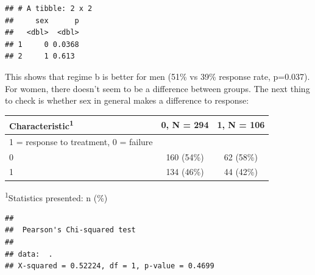 \documentclass[]{book}
\newenvironment{Shaded}{\begin{snugshade}}{\end{snugshade}}
\newcommand{\DataTypeTok}[1]{\textcolor[rgb]{0.13,0.29,0.53}{#1}}
\newcommand{\KeywordTok}[1]{\textcolor[rgb]{0.13,0.29,0.53}{\textbf{#1}}}
\newcommand{\NormalTok}[1]{#1}
\newcommand{\OperatorTok}[1]{\textcolor[rgb]{0.81,0.36,0.00}{\textbf{#1}}}
\newcommand{\OtherTok}[1]{\textcolor[rgb]{0.56,0.35,0.01}{#1}}
\newcommand{\StringTok}[1]{\textcolor[rgb]{0.31,0.60,0.02}{#1}}
\begin{document}
\begin{verbatim}
## # A tibble: 2 x 2
##     sex      p
##   <dbl>  <dbl>
## 1     0 0.0368
## 2     1 0.613
\end{verbatim}

This shows that regime b is better for men (51\% vs 39\% response rate,
p=0.037). For women, there doesn't seem to be a difference between
groups. The next thing to check is whether sex in general makes a
difference to response:

\begin{Shaded}
\end{Shaded}

\captionsetup[table]{labelformat=empty,skip=1pt}
\begin{longtable}{lcc}
\toprule
\textbf{Characteristic}\textsuperscript{1} & \textbf{0}, N = 294 & \textbf{1}, N = 106 \\ 
\midrule
1 = response to treatment, 0 = failure &  &  \\ 
0 & 160 (54\%) & 62 (58\%) \\ 
1 & 134 (46\%) & 44 (42\%) \\ 
\bottomrule
\end{longtable}
\vspace{-5mm}
\begin{minipage}{\linewidth}
\textsuperscript{1}Statistics presented: n (\%) \\ 
\end{minipage}

\begin{Shaded}
\end{Shaded}

\begin{verbatim}
## 
##  Pearson's Chi-squared test
## 
## data:  .
## X-squared = 0.52224, df = 1, p-value = 0.4699
\end{verbatim}
\end{document}
